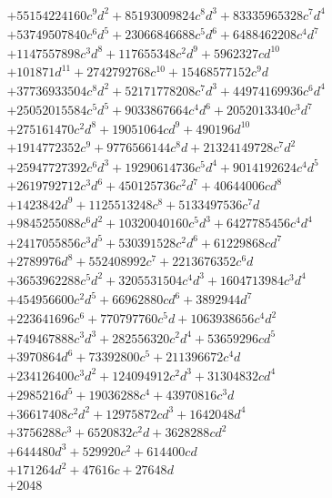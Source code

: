 {\begin{align*}
&+55154224160c^{9}d^{2}+85193009824c^{8}d^{3}+83335965328c^{7}d^{4}\\
&+53749507840c^{6}d^{5}+23066846688c^{5}d^{6}+6488462208c^{4}d^{7}\\
&+1147557898c^{3}d^{8}+117655348c^{2}d^{9}+5962327cd^{10}\\
&+101871d^{11}+2742792768c^{10}+15468577152c^{9}d\\
&+37736933504c^{8}d^{2}+52171778208c^{7}d^{3}+44974169936c^{6}d^{4}\\
&+25052015584c^{5}d^{5}+9033867664c^{4}d^{6}+2052013340c^{3}d^{7}\\
&+275161470c^{2}d^{8}+19051064cd^{9}+490196d^{10}\\
&+1914772352c^{9}+9776566144c^{8}d+21324149728c^{7}d^{2}\\
&+25947727392c^{6}d^{3}+19290614736c^{5}d^{4}+9014192624c^{4}d^{5}\\
&+2619792712c^{3}d^{6}+450125736c^{2}d^{7}+40644006cd^{8}\\
&+1423842d^{9}+1125513248c^{8}+5133497536c^{7}d\\
&+9845255088c^{6}d^{2}+10320040160c^{5}d^{3}+6427785456c^{4}d^{4}\\
&+2417055856c^{3}d^{5}+530391528c^{2}d^{6}+61229868cd^{7}\\
&+2789976d^{8}+552408992c^{7}+2213676352c^{6}d\\
&+3653962288c^{5}d^{2}+3205531504c^{4}d^{3}+1604713984c^{3}d^{4}\\
&+454956600c^{2}d^{5}+66962880cd^{6}+3892944d^{7}\\
&+223641696c^{6}+770797760c^{5}d+1063938656c^{4}d^{2}\\
&+749467888c^{3}d^{3}+282556320c^{2}d^{4}+53659296cd^{5}\\
&+3970864d^{6}+73392800c^{5}+211396672c^{4}d\\
&+234126400c^{3}d^{2}+124094912c^{2}d^{3}+31304832cd^{4}\\
&+2985216d^{5}+19036288c^{4}+43970816c^{3}d\\
&+36617408c^{2}d^{2}+12975872cd^{3}+1642048d^{4}\\
&+3756288c^{3}+6520832c^{2}d+3628288cd^{2}\\
&+644480d^{3}+529920c^{2}+614400cd\\
&+171264d^{2}+47616c+27648d\\
&+2048
\end{align*}
}

